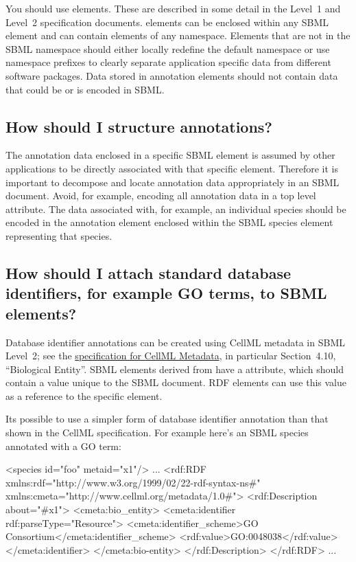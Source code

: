 \documentclass{sbmlfaq}
\begin{document}
You should use  elements.  These are described in some detail in the Level~1 and Level~2
specification documents.   elements can be enclosed within any SBML element and can contain
elements of any namespace. Elements that are not in the SBML namespace should either locally redefine the default namespace
or use namespace prefixes to clearly separate application specific data from different software packages.
Data stored in annotation elements should not contain data that could be or is encoded in SBML.  

\subsection{How should I structure annotations?}

The annotation data enclosed in a specific SBML element is
assumed by other applications to be directly associated with that specific element.
Therefore it is important to decompose and locate annotation data appropriately in an SBML document.
Avoid, for example, encoding all annotation data in a top level attribute.
The data associated
with, for example, an individual species should be encoded in the annotation element enclosed within
the SBML species element representing that species.

\subsection{How should I attach standard database identifiers, for example GO terms, to SBML elements?}

Database identifier annotations can be created using CellML metadata in
SBML Level~2; see the
\href{http://www.cellml.com/public/metadata/cellml_metadata_specification.html}{specification
  for CellML Metadata}, in particular Section~4.10, ``Biological Entity''.
SBML elements derived from  have a  attribute,
which should contain a value unique to the SBML document.  RDF elements can
use this value as a reference to the specific element.

Its possible to use a simpler form of database identifier annotation than that shown
in the CellML specification.  For example here's an SBML species annotated with a GO term:

\begin{example}
<species id="foo" metaid="x1"/>
...
<rdf:RDF xmlns:rdf="http://www.w3.org/1999/02/22-rdf-syntax-ns#"
         xmlns:cmeta="http://www.cellml.org/metadata/1.0#">
  <rdf:Description about="#x1">
    <cmeta:bio_entity>
         <cmeta:identifier rdf:parseType="Resource">
            <cmeta:identifier_scheme>GO Consortium</cmeta:identifier_scheme>
            <rdf:value>GO:0048038</rdf:value>
          </cmeta:identifier>   
    </cmeta:bio-entity>
  </rdf:Description>
</rdf:RDF> 
...
\end{example}
\end{document}

